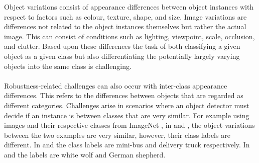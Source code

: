 Object variations consist of appearance differences between object instances with respect to factors such as colour, texture, shape, and size. Image variations are differences not related to the object instances themselves but rather the actual image. This can consist of conditions such as lighting, viewpoint, scale, occlusion, and clutter. Based upon these differences the task of both classifying a given object as a given class but also differentiating the potentially largely varying objects into the same class is challenging.
\\\\
Robustness-related challenges can also occur with inter-class appearance differences. This refers to the differences between objects that are regarded as different categories. Challenges arise in scenarios where an object detector must decide if an instance is between classes that are very similar. For example using images and their respective classes from ImageNet \cite{imagenet}, in  and , the object variations between the two examples are very similar, however, their class labels are different. In  and  the class labels are mini-bus and delivery truck respectively. In  and  the labels are white wolf and German shepherd. 

